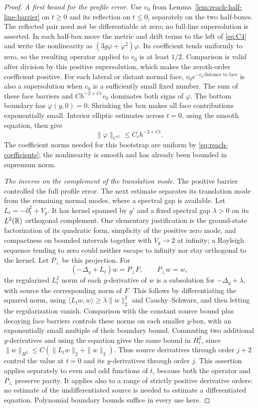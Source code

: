 \begin{proof}
\emph{A first bound for the profile error.}
Use $v_0$ from Lemma~\ref{lem:reach-half-line-barrier} on $t\ge0$
and its reflection on $t\le0$, separately on the two half-boxes.
The reflected pair need not be differentiable at zero; no full-line
supersolution is asserted.  In each half-box move the metric
and drift terms to the left of
\eqref{eq:C4} and write the nonlinearity as
$(3g\varphi+\varphi^2)\varphi$.  Its coefficient tends uniformly to
zero, so the resulting operator applied to $v_0$ is at least $1/2$.
Comparison is valid after division by this positive supersolution,
which makes the zeroth-order coefficient positive.  For each lateral
or distant normal face, $v_0e^{-c_0\,\text{distance to face}}$ is also
a supersolution when $c_0$ is a sufficiently small fixed number.
The sum of these face barriers and $C h^{-2+C\epsilon}v_0$ dominates
both signs of $\varphi$.  The bottom boundary has $\varphi(y,0)=0$.
Shrinking the box makes all face contributions exponentially small.
Interior elliptic estimates across $t=0$, using the smooth equation,
then give
\begin{equation}\label{eq:reach-phi-first}
 \|\varphi\|_{C^{15}}\le C_\epsilon h^{-2+C\epsilon}.
\end{equation}
The coefficient norms needed for this bootstrap are uniform by
\eqref{eq:reach-coefficients}; the nonlinearity is smooth and has
already been bounded in supremum norm.

\emph{The inverse on the complement of the translation mode.}
The positive barrier controlled the full profile error.  The next
estimate separates its translation mode from the remaining normal
modes, where a spectral gap is available.
Let $L_t=-\partial_t^2+V_g$.  It has kernel spanned by $g'$ and
a fixed spectral gap $\lambda>0$ on its $L^2(\mathbb R)$ orthogonal
complement.  One elementary justification is the ground-state
factorization of its quadratic form, simplicity of the positive
zero mode, and compactness on bounded intervals together with
$V_g\to2$ at infinity; a Rayleigh sequence tending to zero could
neither escape to infinity nor stay orthogonal to the kernel.
Let $P_\perp$ be this projection.  For
\[
 (-\Delta_y+L_t)w=P_\perp F,\qquad P_\perp w=w,
\]
the regularized $L_t^2$ norm of each $y$-derivative of $w$ is a
subsolution for $-\Delta_y+\lambda$, with source the corresponding
norm of $F$.  This follows by differentiating the squared norm,
using $\langle L_tw,w\rangle\ge\lambda\|w\|_2^2$ and
Cauchy--Schwarz, and then letting the regularization vanish.
Comparison with the constant source bound plus decaying face
barriers controls these norms on each smaller $y$-box, with an
exponentially small multiple of their boundary bound.  Commuting two
additional $y$-derivatives and using the equation gives the same
bound in $H_t^2$, since
$\|w\|_{H^2}\le C(\|L_tw\|_2+\|w\|_2)$.
Thus source derivatives through order $j+2$ control the value at
$t=0$ and its $y$-derivatives through order $j$.
This assertion applies separately to even and odd functions of $t$,
because both the operator and $P_\perp$ preserve parity.  It applies
also to a range of strictly positive derivative orders: no estimate
of the undifferentiated source is needed to estimate a differentiated
equation.  Polynomial boundary bounds suffice in every use here.


\end{proof}
